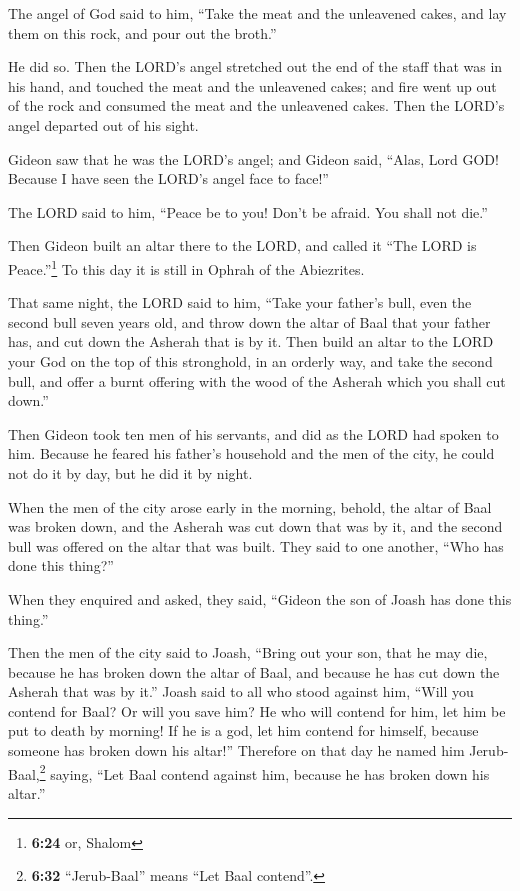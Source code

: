  The angel of God said to him, ``Take the meat and the
unleavened cakes, and lay them on this rock, and pour out the broth.''

He did so.  Then the LORD's angel stretched out the end
of the staff that was in his hand, and touched the meat and the
unleavened cakes; and fire went up out of the rock and consumed the meat
and the unleavened cakes. Then the LORD's angel departed out of his
sight.

 Gideon saw that he was the LORD's angel; and Gideon
said, ``Alas, Lord GOD! Because I have seen the LORD's angel face to
face!''

 The LORD said to him, ``Peace be to you! Don't be
afraid. You shall not die.''

 Then Gideon built an altar there to the LORD, and called
it ``The LORD is Peace.''\footnote{\textbf{6:24} or, Shalom} To this day
it is still in Ophrah of the Abiezrites.

 That same night, the LORD said to him, ``Take your
father's bull, even the second bull seven years old, and throw down the
altar of Baal that your father has, and cut down the Asherah that is by
it.  Then build an altar to the LORD your God on the top
of this stronghold, in an orderly way, and take the second bull, and
offer a burnt offering with the wood of the Asherah which you shall cut
down.''

 Then Gideon took ten men of his servants, and did as the
LORD had spoken to him. Because he feared his father's household and the
men of the city, he could not do it by day, but he did it by night.

 When the men of the city arose early in the morning,
behold, the altar of Baal was broken down, and the Asherah was cut down
that was by it, and the second bull was offered on the altar that was
built.  They said to one another, ``Who has done this
thing?''

When they enquired and asked, they said, ``Gideon the son of Joash has
done this thing.''

 Then the men of the city said to Joash, ``Bring out your
son, that he may die, because he has broken down the altar of Baal, and
because he has cut down the Asherah that was by it.'' 
Joash said to all who stood against him, ``Will you contend for Baal? Or
will you save him? He who will contend for him, let him be put to death
by morning! If he is a god, let him contend for himself, because someone
has broken down his altar!''  Therefore on that day he
named him Jerub-Baal,\footnote{\textbf{6:32} ``Jerub-Baal'' means ``Let
  Baal contend''.} saying, ``Let Baal contend against him, because he
has broken down his altar.''

